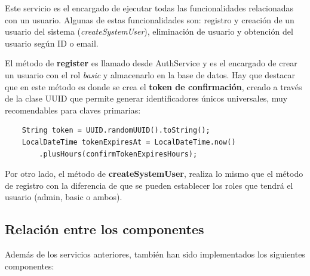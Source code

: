 Este servicio es el encargado de ejecutar todas las funcionalidades relacionadas con un usuario. Algunas de estas funcionalidades son: registro
y creación de un usuario del sistema (\textit{createSystemUser}), eliminación de usuario y obtención del usuario según ID o email. 

El método de \textbf{register} es llamado desde AuthService y es el encargado de crear un usuario con el rol \textit{basic} y almacenarlo en la 
base de datos. Hay que destacar que en este método es donde se crea el \textbf{token de confirmación}, creado a través de la clase UUID que permite 
generar identificadores únicos universales, muy recomendables para claves primarias:

\begin{verbatim}
    String token = UUID.randomUUID().toString();
    LocalDateTime tokenExpiresAt = LocalDateTime.now()
        .plusHours(confirmTokenExpiresHours);
\end{verbatim}


Por otro lado, el método de \textbf{createSystemUser}, realiza lo mismo que el método de registro con la diferencia de que se 
pueden establecer los roles que tendrá el usuario (admin, basic o ambos).

\subsection{Relación entre los componentes}

Además de los servicios anteriores, también han sido implementados los siguientes componentes:

